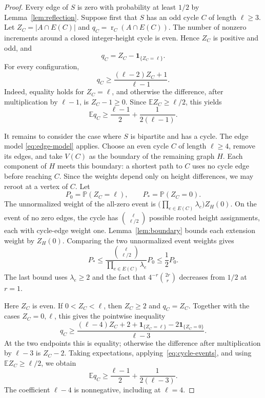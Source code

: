 \documentclass[11pt,reqno]{amsart}
\theoremstyle{remark}
\numberwithin{equation}{section}
\newcommand{\E}{\mathbb E}
\newcommand{\PP}{\mathbb P}
\newcommand{\one}{\mathbf 1}
\DeclareMathOperator{\rk}{r}
\begin{document}
\begin{proof}
Every edge of $S$ is zero with probability at least $1/2$ by
Lemma~\ref{lem:reflection}. Suppose first that $S$ has an odd cycle $C$
of length $\ell\ge3$. Let $Z_C=|A\cap E(C)|$ and
$q_C=\rk_C(A\cap E(C))$. The number of nonzero increments around
a closed integer-height cycle is even. Hence $Z_C$ is positive and odd,
and
\[
 q_C=Z_C-\one_{\{Z_C=\ell\}}.
\]
For every configuration,
\begin{equation}\label{eq:odd-certificate}
 q_C\ge\frac{(\ell-2)Z_C+1}{\ell-1}.
\end{equation}
Indeed, equality holds for $Z_C=\ell$, and otherwise the difference,
after multiplication by $\ell-1$, is $Z_C-1\ge0$.
Since $\E Z_C\ge\ell/2$, this yields
\begin{equation}\label{eq:odd-rank}
 \E q_C\ge\frac{\ell-1}{2}+\frac1{2(\ell-1)}.
\end{equation}

It remains to consider the case where $S$ is bipartite and has a cycle.
The edge model
\eqref{eq:edge-model} applies. Choose an even cycle $C$ of length
$\ell\ge4$, remove its edges, and take $V(C)$ as the boundary of the
remaining graph $H$. Each component of $H$ meets this boundary:
a shortest path to $C$ uses no cycle edge before reaching $C$.
Since the weights depend only on height differences, we may reroot
at a vertex of $C$. Let
\[
 P_0=\PP(Z_C=\ell),\qquad P_*=\PP(Z_C=0).
\]
The unnormalized weight of the all-zero event is
$\bigl(\prod_{e\in E(C)}\lambda_e\bigr) Z_H(0)$.
On the event of no zero edges, the cycle has
$\binom{\ell}{\ell/2}$ possible rooted height assignments, each with
cycle-edge weight one. Lemma~\ref{lem:boundary} bounds each extension
weight by $Z_H(0)$. Comparing the two unnormalized event weights gives
\begin{equation}\label{eq:cycle-events}
 P_*\le\frac{\binom{\ell}{\ell/2}}{\prod_{e\in E(C)}\lambda_e}P_0
      \le\frac12 P_0.
\end{equation}
The last bound uses $\lambda_e\ge2$ and the fact that
$4^{-r}\binom{2r}{r}$ decreases from $1/2$ at $r=1$.

Here $Z_C$ is even. If $0<Z_C<\ell$, then $Z_C\ge2$ and $q_C=Z_C$.
Together with the cases $Z_C=0,\ell$, this gives the pointwise inequality
\begin{equation}\label{eq:even-certificate}
 q_C\ge
 \frac{(\ell-4)Z_C+2+\one_{\{Z_C=\ell\}}
                        -2\one_{\{Z_C=0\}}}{\ell-3}.
\end{equation}
At the two endpoints this is equality; otherwise the difference after
multiplication by $\ell-3$ is $Z_C-2$.
Taking expectations, applying~\eqref{eq:cycle-events}, and using
$\E Z_C\ge\ell/2$, we obtain
\begin{equation}\label{eq:even-rank}
 \E q_C\ge\frac{\ell-1}{2}+\frac1{2(\ell-3)}.
\end{equation}
The coefficient $\ell-4$ is nonnegative, including at $\ell=4$.


\end{proof}
\end{document}
